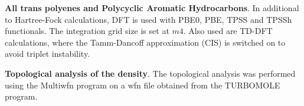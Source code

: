 \documentclass[12pt]{article}
\begin{document}
\textbf{All trans polyenes and Polycyclic Aromatic Hydrocarbons}. In additional to Hartree-Fock calculations, DFT is used with PBE0, PBE, TPSS and TPSSh functionals. \cite{pbe0,pbe,tpss,tpssh} The integration grid size is set at \(m4\). Also used are TD-DFT calculations, where the Tamm-Dancoff approximation (CIS) \cite{tammdancoff} is switched on to avoid triplet instability.

\textbf{Topological analysis of the density}. The topological analysis was performed using the Multiwfn
program on a wfn file obtained from the TURBOMOLE program.\cite{multiwfn}

\clearpage



%
%



\clearpage
\end{document}
